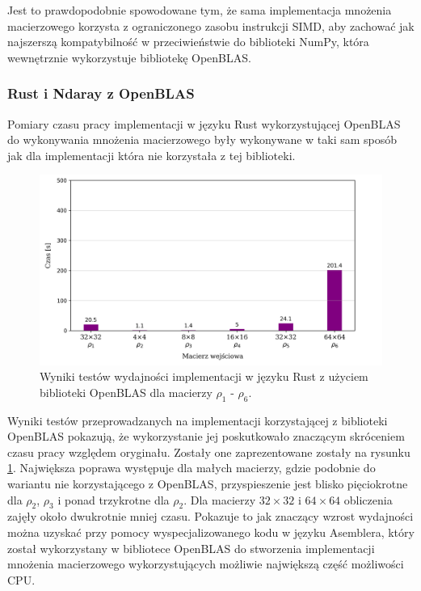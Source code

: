 \documentclass[11pt, a4paper]{article}
\begin{document}
\begin{sloppypar}
    Jest to prawdopodobnie spowodowane tym, że sama implementacja mnożenia macierzowego korzysta
    z ograniczonego zasobu instrukcji SIMD, aby zachować jak najszerszą kompatybilność w
    przeciwieństwie do biblioteki NumPy, która wewnętrznie wykorzystuje bibliotekę OpenBLAS\cite{NumPy_Doc}.

    \subsubsection{ Rust i Ndaray z OpenBLAS }
    Pomiary czasu pracy implementacji w języku Rust wykorzystującej OpenBLAS do
    wykonywania mnożenia macierzowego były wykonywane w taki sam sposób jak dla
    implementacji która nie korzystała z tej biblioteki.

    \begin{figure}[!ht]
      \centering
      \includegraphics[width=1.0\textwidth]{"resources/rust_blas_perf_tests.png"}
      \caption{Wyniki testów wydajności implementacji w języku Rust z użyciem biblioteki OpenBLAS dla macierzy $\rho
      _{1}$ - $\rho_{6}$.}
      \label{rust-openblas-double-precision}
    \end{figure}

    Wyniki testów przeprowadzanych na implementacji korzystającej z biblioteki OpenBLAS pokazują,
    że wykorzystanie jej poskutkowało znaczącym skróceniem czasu pracy względem
    oryginału. Zostały one zaprezentowane zostały na rysunku \ref{rust-openblas-double-precision}.
    Największa poprawa występuje dla małych macierzy, gdzie podobnie do wariantu nie korzystającego
    z OpenBLAS, przyspieszenie jest blisko pięciokrotne dla $\rho_{2}$, $\rho_{3}$ i ponad
    trzykrotne dla $\rho_{2}$. Dla macierzy $32\times32$ i $64\times64$ obliczenia
    zajęły około dwukrotnie mniej czasu. Pokazuje to jak znaczący wzrost wydajności można
    uzyskać przy pomocy wyspecjalizowanego kodu w języku Asemblera, który został
    wykorzystany w bibliotece OpenBLAS do stworzenia implementacji mnożenia macierzowego
    wykorzystujących możliwie największą część możliwości CPU.


\end{sloppypar}
\end{document}
